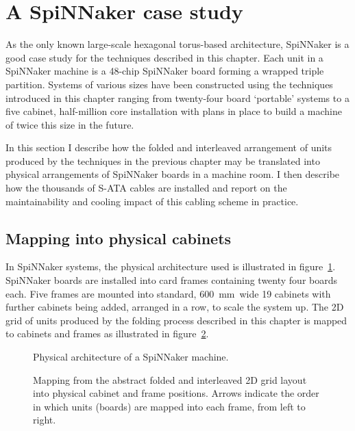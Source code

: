 	\section{A SpiNNaker case study}
		
		As the only known large-scale hexagonal torus-based architecture, SpiNNaker
		is a good case study for the techniques described in this chapter.  Each
		unit in a SpiNNaker machine is a 48-chip SpiNNaker board forming a
		wrapped triple partition. Systems of various sizes have been constructed
		using the techniques introduced in this chapter ranging from twenty-four
		board `portable' systems to a five cabinet, half-million core installation
		with plans in place to build a machine of twice this size in the future.
		
		In this section I describe how the folded and interleaved arrangement of
		units produced by the techniques in the previous chapter may be translated
		into physical arrangements of SpiNNaker boards in a machine room. I then
		describe how the thousands of S-ATA cables are installed and report on the
		maintainability and cooling impact of this cabling scheme in practice.
		
		\subsection{Mapping into physical cabinets}
			
			In SpiNNaker systems, the physical architecture used is illustrated in
			figure~\ref{fig:cabinet-units}. SpiNNaker boards are installed into card
			frames containing twenty four boards each. Five frames are mounted into
			standard, \SI{600}{\milli\meter}~wide 19\inch{} cabinets with further
			cabinets being added, arranged in a row, to scale the system up. The 2D
			grid of units produced by the folding process described in this chapter
			is mapped to cabinets and frames as illustrated in
			figure~\ref{fig:cabinetisation}.
			
			\begin{figure}
				\center
				
				\caption{Physical architecture of a SpiNNaker machine.}
				\label{fig:cabinet-units}
			\end{figure}
			
			\begin{figure}
				\center
				
				\caption[Mapping cabling from abstract to physical space.]%
				{Mapping from the abstract folded and interleaved 2D grid
				layout into physical cabinet and frame positions. Arrows indicate the
				order in which units (boards) are mapped into each frame, from
				left to right.}
				\label{fig:cabinetisation}
			\end{figure}
			
